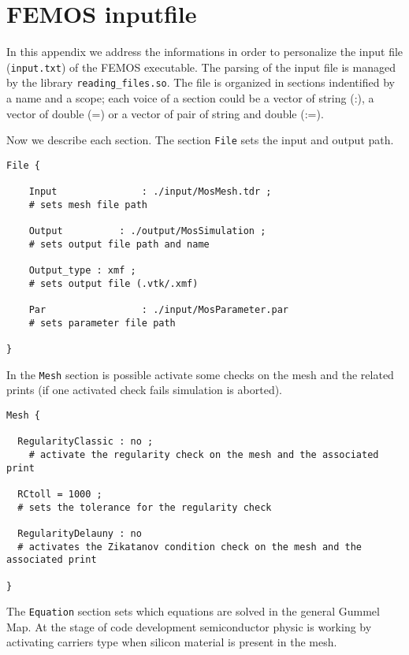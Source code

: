 \chapter{FEMOS inputfile}

In this appendix we address the informations in order to personalize the input file (\texttt{input.txt}) of the FEMOS executable. The parsing of the input file is managed by the library \texttt{reading\_files.so}. The file is organized in sections indentified by a name and a scope; each voice of a section could be a vector of string (:), a vector of double (=) or a vector of pair of string and double (:=).

Now we describe each section.
The section \texttt{File} sets the input and output path.
\vspace{0.5cm}
\begin{lstlisting}[style = general]
File {

	Input				: ./input/MosMesh.tdr ;			
	# sets mesh file path
		
	Output			: ./output/MosSimulation ;	
	# sets output file path and name
	
	Output_type	: xmf ;
	# sets output file (.vtk/.xmf) 
	
	Par					: ./input/MosParameter.par
	# sets parameter file path

}
\end{lstlisting}

\vspace{0.5cm}
In the \texttt{Mesh} section is possible activate some checks on the mesh and the related prints (if one activated check fails simulation is aborted).
\vspace{0.5cm}

\begin{lstlisting}[style = general]
Mesh {

  RegularityClassic : no ; 
	# activate the regularity check on the mesh and the associated print

  RCtoll = 1000 ;
  # sets the tolerance for the regularity check
  
  RegularityDelauny : no
  # activates the Zikatanov condition check on the mesh and the associated print
  
}
\end{lstlisting}

\vspace{0.5cm}
The \texttt{Equation} section sets which equations are solved in the general Gummel Map. At the stage of code development semiconductor physic is working by activating carriers type when silicon material is present in the mesh.
\vspace{0.5cm}

